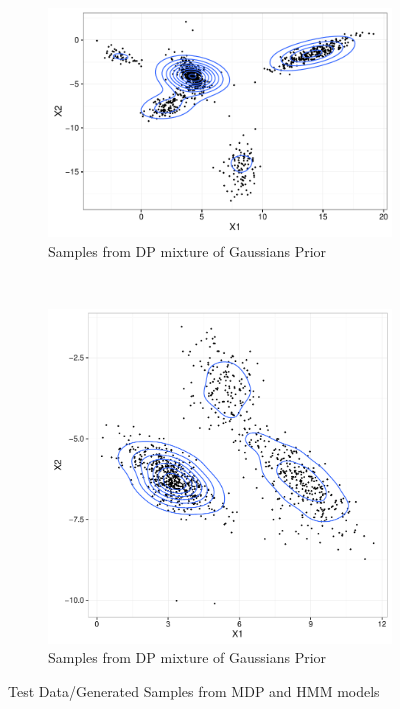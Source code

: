 \documentclass[12pt]{article}
\begin{document}
\begin{figure}[h!]
    \begin{subfigure}{0.5\textwidth}
        \centering
        \includegraphics[width = 0.5\linewidth]{plots/DP_GMM1.pdf}
        \caption{Samples from DP mixture of Gaussians Prior}
        \label{fig:1c}
    \end{subfigure}%
    ~
    \begin{subfigure}{0.5\textwidth}
        \centering
        \includegraphics[width = 0.5\linewidth]{plots/DP_GMM2.pdf}
        \caption{Samples from DP mixture of Gaussians Prior}
        \label{fig:1d}
    \end{subfigure}%
    \caption{Test Data/Generated Samples from MDP and HMM models}
 \end{figure}
\end{document}
